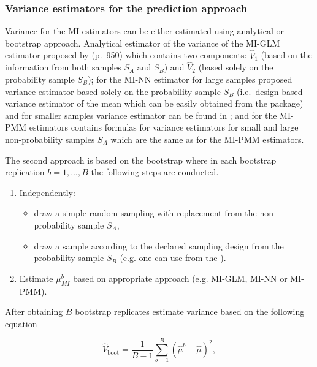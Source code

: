 \documentclass[
]{jss}
\begin{document}
\subsubsection{Variance estimators for the prediction
approach}\label{variance-estimators-for-the-prediction-approach}

Variance for the MI estimators can be either estimated using analytical
or bootstrap approach. Analytical estimator of the variance of the
MI-GLM estimator proposed by \citet{kim_combining_2021} (p.~950) which
contains two components: \(\hat{V}_1\) (based on the information from
both samples \(S_A\) and \(S_B\)) and \(\hat{V}_2\) (based solely on the
probability sample \(S_B\)); for the MI-NN estimator for large samples
\citet{yang2021integration} proposed variance estimator based solely on
the probability sample \(S_B\) (i.e.~design-based variance estimator of
the mean which can be easily obtained from the  package) and
for smaller samples variance estimator can be found in
\citet{chlebicki2025}; and for the MI-PMM estimators
\citet{chlebicki2025} contains formulas for variance estimators for
small and large non-probability samples \(S_A\) which are the same as
for the MI-PMM estimators.

The second approach is based on the bootstrap where in each bootstrap
replication \(b=1,...,B\) the following steps are conducted.

\begin{enumerate}
\item Independently:
  \begin{itemize}
  \item draw a simple random sampling with replacement from the non-probability sample $S_A$,
  \item draw a sample according to the declared sampling design from the probability sample $S_B$ (e.g. one can use  from the ).
  \end{itemize}
\item Estimate $\mu_{MI}^b$ based on appropriate approach (e.g. MI-GLM, MI-NN or MI-PMM).
\end{enumerate}

After obtaining \(B\) bootstrap replicates estimate variance based on
the following equation

\begin{equation}
\hat{V}_{\text{boot}} = \frac{1}{B-1}\sum_{b=1}^B\left(\hat{\mu}^b - \hat{\mu}\right)^2,
\label{eq-var-bootstrap}
\end{equation}
\end{document}

